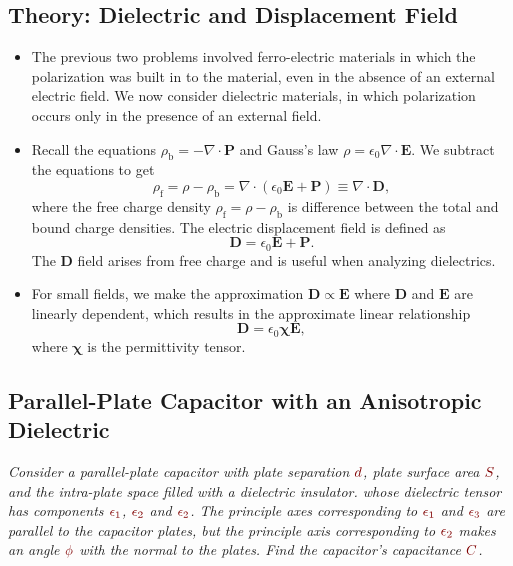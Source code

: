 \documentclass[11pt, a4paper]{article}
\newcommand{\dmath}[1]{\textcolor{Maroon}{#1}}  %
\renewcommand{\vec}[1]{\bm{#1}} %
\newcommand{\E}{\vec{E}}  %
\newcommand{\D}{\vec{D}}  %
\newcommand{\e}{\epsilon}
\newcommand{\ee}{\epsilon_{0}}  %
\newcommand{\eee}{\bm{\chi}}  %
\renewcommand{\P}{\vec{P}}  %
\renewcommand{\div}{\nabla \cdot}
\begin{document}
\subsection{Theory: Dielectric and Displacement Field}
\begin{itemize}
		\item The previous two problems involved ferro-electric materials in which the polarization was built in to the material, even in the absence of an external electric field. We now consider dielectric materials, in which polarization occurs only in the presence of an external field. 
		
		\item Recall the equations $ \rho_{\text{b}} = - \div \P $ and Gauss's law $ \rho = \ee \div \E $. We subtract the equations to get
		\begin{equation*}
			\rho_{\text{f}} = \rho - \rho_{\text{b}} = \div (\ee \E + \P) \equiv \div \D,
		\end{equation*}
		where the free charge density $ \rho_{\text{f}} = \rho - \rho_{\text{b}} $ is difference between the total and bound charge densities. The electric displacement field is defined as
		\begin{equation*}
			\D = \ee \E + \P.
		\end{equation*}
		The $ \D $ field arises from free charge and is useful when analyzing dielectrics.
		
		\item For small fields, we make the approximation $ \D \propto \E $ where $ \D $ and $ \E $ are linearly dependent, which results in the approximate linear relationship 
		\begin{equation*}
			\D = \ee \eee \E,
		\end{equation*}
		where $ \eee $ is the permittivity tensor.
\end{itemize}

\subsection{Parallel-Plate Capacitor with an Anisotropic Dielectric}
\textit{Consider a parallel-plate capacitor with plate separation $ \dmath{d} $, plate surface area $ \dmath{S} $, and the intra-plate space filled with a dielectric insulator. whose dielectric tensor has components $ \dmath{\e_{1}} $, $ \dmath{\e_{2}} $ and $ \dmath{\e_{2}} $. The principle axes corresponding to $ \dmath{\e_{1}} $ and $ \dmath{\e_{3}} $ are parallel to the capacitor plates, but the principle axis corresponding to $ \dmath{\e_{2}} $ makes an angle $ \dmath{\phi} $ with the normal to the plates. Find the capacitor's capacitance $ \dmath{C} $.}
\end{document}
